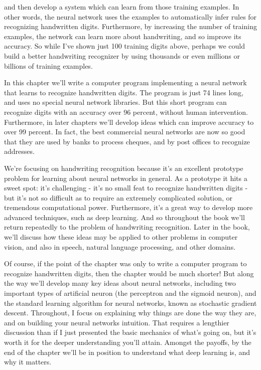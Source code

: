 \documentclass[a4paper,12pt]{report}%
\begin{document}
and then develop a system which can learn from those training examples. In other words, the neural network uses the examples to automatically infer rules for recognizing handwritten digits. Furthermore, by increasing the number of training examples, the network can learn more about handwriting, and so improve its accuracy. So while I've shown just 100 training digits above, perhaps we could build a better handwriting recognizer by using thousands or even millions or billions of training examples.

In this chapter we'll write a computer program implementing a neural network that learns to recognize handwritten digits. The program is just 74 lines long, and uses no special neural network libraries. But this short program can recognize digits with an accuracy over 96 percent, without human intervention. Furthermore, in later chapters we'll develop ideas which can improve accuracy to over 99 percent. In fact, the best commercial neural networks are now so good that they are used by banks to process cheques, and by post offices to recognize addresses.

We're focusing on handwriting recognition because it's an excellent prototype problem for learning about neural networks in general. As a prototype it hits a sweet spot: it's challenging - it's no small feat to recognize handwritten digits - but it's not so difficult as to require an extremely complicated solution, or tremendous computational power. Furthermore, it's a great way to develop more advanced techniques, such as deep learning. And so throughout the book we'll return repeatedly to the problem of handwriting recognition. Later in the book, we'll discuss how these ideas may be applied to other problems in computer vision, and also in speech, natural language processing, and other domains.

Of course, if the point of the chapter was only to write a computer program to recognize handwritten digits, then the chapter would be much shorter! But along the way we'll develop many key ideas about neural networks, including two important types of artificial neuron (the perceptron and the sigmoid neuron), and the standard learning algorithm for neural networks, known as stochastic gradient descent. Throughout, I focus on explaining why things are done the way they are, and on building your neural networks intuition. That requires a lengthier discussion than if I just presented the basic mechanics of what's going on, but it's worth it for the deeper understanding you'll attain. Amongst the payoffs, by the end of the chapter we'll be in position to understand what deep learning is, and why it matters.
\end{document}
